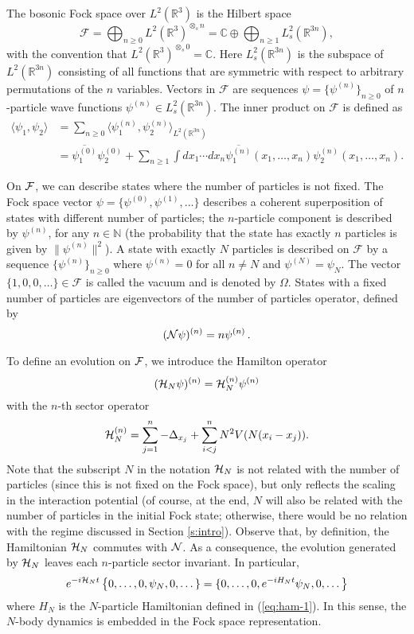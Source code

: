 \documentclass[11pt,a4paper]{article}
\newcommand{\bN}{{\mathbb N}}
\newcommand{\cF}{{\cal F}}
\newcommand{\cH}{{\cal H}}
\newcommand{\cN}{{\cal N}}
\newcommand{\R}{\mathbb{R}}
\begin{document}
The bosonic Fock space over $L^2(\R^3)$ is the Hilbert space
\[
  \mathcal{F} = \bigoplus_{n \ge 0} L^2(\R^3)^{\otimes_s n} = \mathbb{C}
  \oplus \bigoplus_{n \ge 1} L^2_s(\R^{3n}),
\]
with the convention that $L^2(\R^3)^{\otimes_s 0} = \mathbb{C}$. Here
$L^2_s (\R^{3n})$ is the subspace of $L^2(\R^{3n})$ consisting of all functions
that are symmetric with respect to arbitrary permutations of the $n$
variables. Vectors in $\mathcal{F}$ are sequences $\psi = \{\psi^{(n)}\}_{n
\ge 0}$ of $n$-particle wave functions $\psi^{(n)} \in L^2_s(\R^{3n})$. The
inner product on $\mathcal{F}$ is defined as
\begin{align*}
  \langle \psi_1, \psi_2 \rangle & = \sum_{n \ge 0} \langle \psi_1^{(n)},
  \psi_2^{(n)} \rangle_{L^2(\R^{3n})} \\
  & = \overline{\psi_1^{(0)}} \psi_2^{(0)} + \sum_{n \ge 1} \int dx_1 \cdots
  dx_n \overline{\psi_1^{(n)}}(x_1, \dots, x_n) \psi_2^{(n)}(x_1, \dots, x_n).
\end{align*}

On $\cF$, we can describe states where the number of particles is not fixed.
The Fock space vector $\psi = \{ \psi^{(0)}, \psi^{(1)}, \dots  \}$
describes a coherent superposition of states with different number of
particles; the $n$-particle component is described by $\psi^{(n)}$, for any
$n \in \bN$ (the probability that the state has exactly $n$ particles is
given by $\| \psi^{(n)} \|^2$).  A state with exactly $N$ particles is
described on $\mathcal{F}$ by a sequence $\{\psi^{(n)}\}_{n \ge 0}$ where
$\psi^{(n)} = 0$ for all $n \neq N$ and $\psi^{(N)} = \psi_N$. The vector
$\{1, 0, 0, \dots \} \in \mathcal{F}$ is called the vacuum and is denoted by
$\Omega$. States with a fixed number of particles are eigenvectors of the
number of particles operator, defined by
\[ (\cN \psi)^{(n)} = n \psi^{(n)} \, . \]

To define an evolution on $\cF$, we introduce the Hamilton operator 
\[ (\cH_N \psi)^{(n)} = \cH_N^{(n)} \psi^{(n)} \]
with the $n$-th sector operator 
\[ \cH_N^{(n)} = \sum_{j=1}^n -\Delta_{x_j} + \sum_{i<j}^n N^2 V(N (x_i - x_j)). \]
Note that the subscript $N$ in the notation $\cH_N$ is not related with the number of particles (since this is not fixed on the Fock space), but only reflects the scaling in the interaction potential (of course, at the end, $N$ will also be related with the number of particles in the initial Fock state; otherwise, there would be no relation with the regime discussed in Section \ref{s:intro}). Observe that, by definition, the Hamiltonian $\cH_N$ commutes with $\cN$. As a consequence, the evolution generated by $\cH_N$ leaves each $n$-particle sector invariant. In particular, 
\[ e^{-i\cH_N t}  \left\{ 0, \dots , 0, \psi_N , 0 ,\dots \} = \{ 0, \dots, 0, e^{-iH_N t} \psi_N , 0 ,\dots \right\} \]
where $H_N$ is the $N$-particle Hamiltonian defined in (\ref{eq:ham-1}). In this sense, the $N$-body dynamics is embedded in the Fock space representation. 
\end{document}
